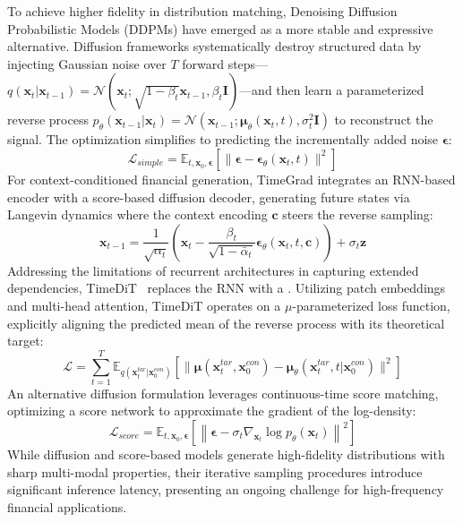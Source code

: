 To achieve higher fidelity in distribution matching, Denoising Diffusion Probabilistic Models (DDPMs) \citep{ho2020ddpm} have emerged as a more stable and expressive alternative. Diffusion frameworks systematically destroy structured data by injecting Gaussian noise over $T$ forward steps—$q(\mathbf{x}_t|\mathbf{x}_{t-1}) = \mathcal{N}(\mathbf{x}_t; \sqrt{1 - \beta_t}\mathbf{x}_{t-1}, \beta_t \mathbf{I})$—and then learn a parameterized reverse process $p_\theta(\mathbf{x}_{t-1}|\mathbf{x}_t) = \mathcal{N}(\mathbf{x}_{t-1}; \boldsymbol{\mu}_\theta(\mathbf{x}_t, t), \sigma_t^2 \mathbf{I})$ to reconstruct the signal. The optimization simplifies to predicting the incrementally added noise $\boldsymbol{\epsilon}$:
\begin{equation}
\mathcal{L}_{simple} = \mathbb{E}_{t, \mathbf{x}_0, \boldsymbol{\epsilon}}[\|\boldsymbol{\epsilon} - \boldsymbol{\epsilon}_\theta(\mathbf{x}_t, t)\|^2]
\end{equation}
For context-conditioned financial generation, TimeGrad \citep{rasul2021timegrad} integrates an RNN-based encoder with a score-based diffusion decoder, generating future states via Langevin dynamics where the context encoding $\mathbf{c}$ steers the reverse sampling:
\begin{equation}
\mathbf{x}_{t-1} = \frac{1}{\sqrt{\alpha_t}} \left( \mathbf{x}_t - \frac{\beta_t}{\sqrt{1 - \bar{\alpha}_t}} \boldsymbol{\epsilon}_\theta(\mathbf{x}_t, t, \mathbf{c}) \right) + \sigma_t \mathbf{z}
\end{equation}
Addressing the limitations of recurrent architectures in capturing extended dependencies, TimeDiT~\citep{cao2024timedit} replaces the RNN with a . Utilizing patch embeddings and multi-head attention, TimeDiT operates on a $\mu$-parameterized loss function, explicitly aligning the predicted mean of the reverse process with its theoretical target:
\begin{equation}
\mathcal{L} = \sum_{t=1}^T \mathbb{E}_{q(\mathbf{x}_t^{tar}|\mathbf{x}_0^{con})} \left[ \|\boldsymbol{\mu}(\mathbf{x}_t^{tar}, \mathbf{x}_0^{con}) - \boldsymbol{\mu}_\theta(\mathbf{x}_t^{tar}, t|\mathbf{x}_0^{con})\|^2 \right]
\end{equation}
An alternative diffusion formulation leverages continuous-time score matching, optimizing a score network to approximate the gradient of the log-density:
\begin{equation}
\mathcal{L}_{score} = \mathbb{E}_{t, \mathbf{x}_0, \boldsymbol{\epsilon}} \left[ \left\| \boldsymbol{\epsilon} - \sigma_t \nabla_{\mathbf{x}_t} \log p_\theta(\mathbf{x}_t) \right\|^2 \right]
\end{equation}
While diffusion and score-based models generate high-fidelity distributions with sharp multi-modal properties, their iterative sampling procedures introduce significant inference latency, presenting an ongoing challenge for high-frequency financial applications.

